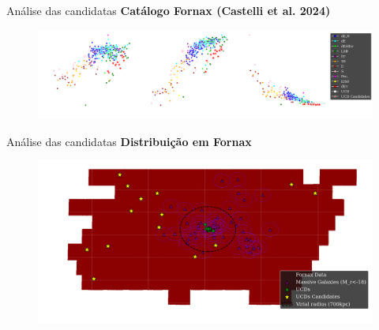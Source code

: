 \begin{frame}[c]{Análise das candidatas}
\small
\textbf{Catálogo Fornax (Castelli et al. 2024)}

\begin{figure}
    \includegraphics[width=\paperwidth,height=0.9\paperheight,keepaspectratio]{images/analise_junta.png}
\end{figure}

\end{frame}


\begin{frame}[c]{Análise das candidatas}
\small
\textbf{Distribuição em Fornax}

\begin{figure}
    \centering
    \includegraphics[width=1.\linewidth]{images/candidates_distribution.png}
\end{figure}

\end{frame}

